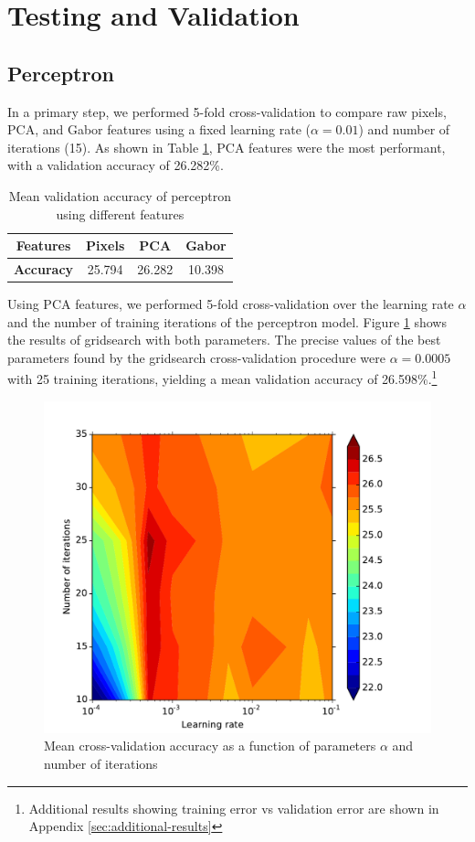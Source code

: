 \documentclass{acm_proc_article-sp}
\begin{document}
\section{Testing and Validation}%

\subsection{Perceptron}
In a primary step, we performed 5-fold cross-validation to compare raw pixels, PCA, and Gabor features using a fixed learning rate ($\alpha = 0.01$) and number of iterations (15). As shown in Table \ref{tab:perc-features}, PCA features were the most performant, with a validation accuracy of 26.282\%.
\begin{table}[h!]
  \centering
  \begin{tabular}{|c||c|c|c| }
    \hline
    {\bfseries Features} & Pixels & PCA & Gabor \\
    \hline
    {\bfseries Accuracy} & 25.794 & 26.282 & 10.398 \\
    \hline
  \end{tabular}
  \caption{Mean validation accuracy of perceptron using different features}
  \label{tab:perc-features}
\end{table}

Using PCA features, we performed 5-fold cross-validation over the learning rate $\alpha$ and the number of training iterations of the perceptron model. Figure \ref{fig:perc-gridsearch} shows the results of gridsearch with both parameters. The precise values of the best parameters found by the gridsearch cross-validation procedure were $\alpha = 0.0005$ with 25 training iterations, yielding a mean validation accuracy of 26.598\%.\footnote{Additional results showing training error vs validation error are shown in Appendix \ref{sec:additional-results}}
\begin{figure}[h!]
	\centering
	\includegraphics[width=\linewidth]{perceptron_gridsearch}
  	\caption{Mean cross-validation accuracy as a function of parameters $\alpha$ and number of iterations}
  	\label{fig:perc-gridsearch}
\end{figure}
\end{document}
